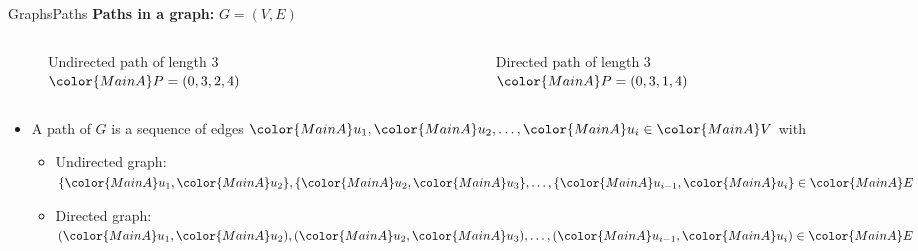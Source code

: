 

\begin{frame}{Graphs}{Paths}
  \textbf{Paths in a graph:}
         {\color{MainA}$G = (V , E)$}
  \begin{columns}
    \begin{column}[b]{0.5\linewidth}
      \begin{figure}
        \begin{adjustbox}{width=0.95\linewidth}
          
        \end{adjustbox}
        \caption{{\color{MainA}Undirected path} of length 3 \newline
          ${\color{MainA}P} = (0, 3, 2, 4)$}
        \label{fig:graphs:undirected_path}
      \end{figure}
    \end{column}
    \begin{column}[b]{0.5\linewidth}
      \begin{figure}
        \begin{adjustbox}{width=0.95\linewidth}
          
        \end{adjustbox}
        \caption{{\color{MainA}Directed path} of length 3 \newline
          ${\color{MainA}P} = (0, 3, 1, 4)$}
        \label{fig:graphs:directed_path}
      \end{figure}
    \end{column}
  \end{columns}
  \begin{itemize}
    \item<3->
      A path of {\color{MainA}$G$} is a sequence of edges
      \begin{math}
        {\color{MainA}u_1},
        {\color{MainA}u_2},
        \dots,
        {\color{MainA}u_i} \in {\color{MainA}V}
      \end{math}
      with
      \begin{itemize}
        \item<4->
          Undirected graph:
          \begin{math}
            \{{\color{MainA}u_1}, {\color{MainA}u_2}\},
            \{{\color{MainA}u_2}, {\color{MainA}u_3}\},
            \dots,
            \{{\color{MainA}u_{i-1}}, {\color{MainA}u_i}\} \in
            {\color{MainA}E}
          \end{math}
        \item<4->
          Directed graph:
          \begin{math}
          ({\color{MainA}u_1}, {\color{MainA}u_2}),
          ({\color{MainA}u_2}, {\color{MainA}u_3}),
          \dots,
          ({\color{MainA}u_{i-1}}, {\color{MainA}u_i}) \in
          {\color{MainA}E}
          \end{math}
      \end{itemize}
  \end{itemize}
\end{frame}


